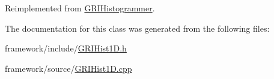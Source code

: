 \-Reimplemented from \hyperlink{classGRIHistogrammer_aebab3a7be1897725c6ab031266458b71}{\-G\-R\-I\-Histogrammer}.



\-The documentation for this class was generated from the following files\-:\begin{DoxyCompactItemize}
\item 
framework/include/\hyperlink{GRIHist1D_8h}{\-G\-R\-I\-Hist1\-D.\-h}\item 
framework/source/\hyperlink{GRIHist1D_8cpp}{\-G\-R\-I\-Hist1\-D.\-cpp}\end{DoxyCompactItemize}
